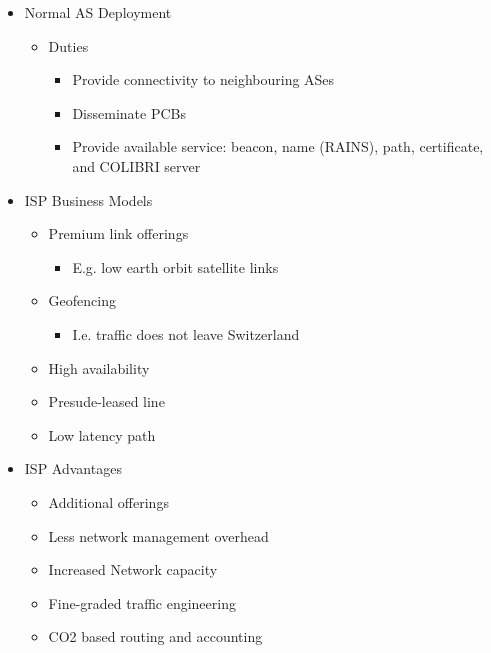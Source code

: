 \begin{itemize}
\begin{itemize}
\begin{itemize}
                \end{itemize}
            \item Normal AS Deployment
                \begin{itemize}
                    \item Duties
                        \begin{itemize}
                            \item Provide connectivity to neighbouring ASes
                            \item Disseminate PCBs
                            \item Provide available service: beacon, name (RAINS), path, certificate, and COLIBRI server
                        \end{itemize}
                \end{itemize}
            \item ISP Business Models
                \begin{itemize}
                    \item Premium link offerings
                        \begin{itemize}
                            \item E.g. low earth orbit satellite links
                        \end{itemize}
                    \item Geofencing
                        \begin{itemize}
                            \item I.e. traffic does not leave Switzerland
                        \end{itemize}
                    \item High availability
                    \item Presude-leased line
                    \item Low latency path
                \end{itemize}
            \item ISP Advantages
                \begin{itemize}
                    \item Additional offerings
                    \item Less network management overhead
                    \item Increased Network capacity
                    \item Fine-graded traffic engineering
                    \item CO2 based routing and accounting

\end{itemize}
\end{itemize}
\end{itemize}
